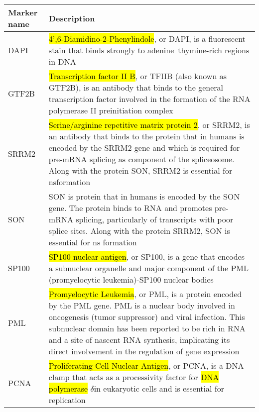 \begin{longtable}{>{\centering\arraybackslash}m{\mylengtha} | m{\mylengthb}}
    \hline
    Marker name & Description \\
    \hline
    DAPI & \hl{4',6-Diamidino-2-Phenylindole}, or DAPI, is a fluorescent stain that binds strongly to adenine–thymine-rich regions in DNA \cite{kapuscinski1995dapi} \\
    \hline
    GTF2B & \hl{Transcription factor II B}, or TFIIB (also known as GTF2B), is an antibody that binds to the general transcription factor involved in the formation of the RNA polymerase II preinitiation complex \cite{lewin2004genes} \\
    \hline
    SRRM2 & \hl{Serine/arginine repetitive matrix protein 2}, or SRRM2, is an antibody that binds to the protein that in humans is encoded by the SRRM2 gene and which is required for pre-mRNA splicing as component of the spliceosome. Along with the protein SON, SRRM2 is essential for \gls{ns}\footnotemark formation \cite{ilik2020and} \\
    \hline
    SON & SON is protein that in humans is encoded by the SON gene. The protein binds to RNA and promotes pre-mRNA splicing, particularly of transcripts with poor splice sites. Along with the protein SRRM2, SON is essential for \gls{ns} formation \cite{ilik2020and} \\
    \hline
    SP100 & \hl{SP100 nuclear antigen\footnotemark}, or SP100, is a gene that encodes a subnuclear organelle and major component of the PML (promyelocytic leukemia)-SP100 nuclear bodies \cite{sp100} \\
    \hline
    PML & \hl{Promyelocytic Leukemia}, or PML, is a protein encoded by the PML gene. PML is a nuclear body involved in oncogenesis (tumor suppressor) and viral infection. This subnuclear domain has been reported to be rich in RNA and a site of nascent RNA synthesis, implicating its direct involvement in the regulation of gene expression \cite{boisvert2000promyelocytic} \\
    \hline
    PCNA & \hl{Proliferating Cell Nuclear Antigen}, or PCNA, is a DNA clamp that acts as a processivity factor for \hl{DNA polymerase} $\delta$\footnotemark in eukaryotic cells and is essential for replication \cite{kisielewska2005gfp} \\

\end{longtable}
